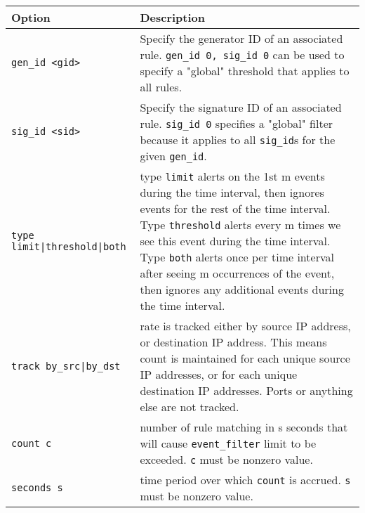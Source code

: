 \documentclass[english]{report}
\begin{document}
\begin{table}[h]
\begin{center}
\begin{tabular}{| l | p{4.5in} |}

\hline
\textbf{Option} & \textbf{Description}\\
\hline

\hline
\texttt{gen\_id <gid>} &

Specify the generator ID of an associated rule.  \texttt{gen\_id 0, sig\_id 0}
can be used to specify a "global" threshold that applies to all rules.\\

\hline \texttt{sig\_id <sid>} &

Specify the signature ID of an associated rule.  \texttt{sig\_id 0} specifies a
"global" filter because it applies to all \texttt{sig\_id}s for the given
\texttt{gen\_id}.\\

\hline
\texttt{type limit|threshold|both} &

type \texttt{limit} alerts on the 1st m events during the time interval, then
ignores events for the rest of the time interval.  Type \texttt{threshold}
alerts every m times we see this event during the time interval.  Type
\texttt{both} alerts once per time interval after seeing m occurrences of the
event, then ignores any additional events during the time interval.\\

\hline
\texttt{track by\_src|by\_dst} &

rate is tracked either by source IP address, or destination IP address.  This
means count is maintained for each unique source IP addresses, or for each
unique destination IP addresses.  Ports or anything else are not tracked.\\

\hline
\texttt{count c} &

number of rule matching in s seconds that will cause \texttt{event\_filter}
limit to be exceeded.  \texttt{c} must be nonzero value.\\

\hline
\texttt{seconds s} &

time period over which \texttt{count} is accrued.  \texttt{s} must be nonzero
value.\\

\hline
\end{tabular}
\end{center}
\end{table}
\end{document}
